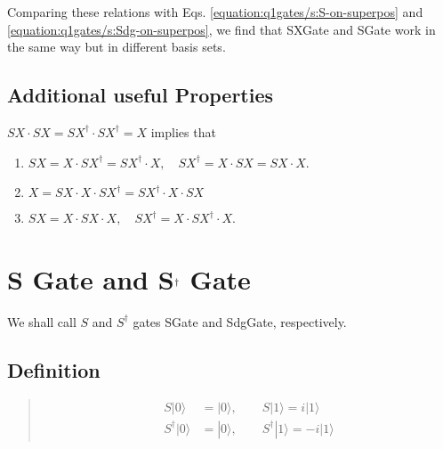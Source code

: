 \documentclass[letterpaper,10pt,english]{jupyterBook}
\begin{document}
\sphinxAtStartPar
Comparing these relations with Eqs. \eqref{equation:q1gates/s:S-on-superpos} and \eqref{equation:q1gates/s:Sdg-on-superpos}, we find that SXGate and SGate work in the same way but in different basis sets.


\subsection{Additional useful Properties}
\label{\detokenize{q1gates/sx:additional-useful-properties}}
\sphinxAtStartPar
\(SX \cdot SX = SX^\dagger \cdot SX^\dagger = X\) implies that
\begin{enumerate}
%
\item {}
\sphinxAtStartPar
\(SX = X \cdot SX^\dagger = SX^\dagger\cdot X, \quad SX^\dagger = X \cdot SX = SX \cdot X\).

\item {}
\sphinxAtStartPar
\(X = SX \cdot X \cdot SX^\dagger = SX^\dagger \cdot X \cdot SX\)

\item {}
\sphinxAtStartPar
\(SX = X \cdot SX \cdot X, \quad SX^\dagger = X \cdot SX^\dagger \cdot X\).

\end{enumerate}

\sphinxstepscope


\section{S Gate and S\protect\(^\dagger\protect\) Gate}
\label{\detokenize{q1gates/s:s-gate-and-s-dagger-gate}}\label{\detokenize{q1gates/s:sec-sgate}}\label{\detokenize{q1gates/s::doc}}
\sphinxAtStartPar
We shall call \(S\) and \(S^\dagger\) gates SGate and SdgGate, respectively.

\sphinxAtStartPar
{}


\subsection{Definition}
\label{\detokenize{q1gates/s:definition}}
\sphinxAtStartPar
{}
\begin{quote}
\begin{align}
S |0\rangle &= |0\rangle, \qquad S |1\rangle = i|1\rangle \\
S^\dagger |0\rangle &= |0\rangle, \qquad S^\dagger |1\rangle = -i|1\rangle\label{equation:q1gates/s:SGate}
\end{align}
\end{quote}
\end{document}
